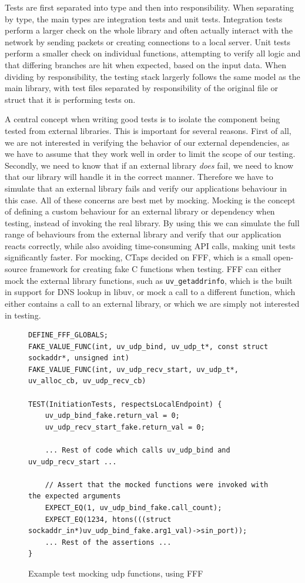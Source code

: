 Tests are first separated into type and then into responsibility. When separating
by type, the main types are integration tests and unit tests. Integration tests perform a larger check on the
whole library and often actually interact with the network by sending packets or creating
connections to a local server. 
Unit tests perform a smaller check on individual functions, attempting to verify
all logic and that differing branches are hit when expected, based on the input data.
When dividing by responsibility, the testing stack largerly follows the same model
as the main library, with test files separated by responsibility of the original
file or struct that it is performing tests on.

A central concept when writing good tests is to isolate the component being tested from
external libraries. This is important for several reasons. First of all, we are not interested
in verifying the behavior of our external dependencies, as we have to assume that they
work well in order to limit the scope of our testing. Secondly, we need to know that if
an external library \textit{does} fail, we need to know that our library will handle it
in the correct manner. Therefore we have to simulate that an external library fails and
verify our applications behaviour in this case. All of these concerns are best met by
mocking. Mocking is the concept of defining a custom behaviour for an external library
or dependency when testing, instead of invoking the real library. By using this we can
simulate the full range of behaviours from the external library and verify that our application
reacts correctly, while also avoiding time-consuming API calls, making unit tests
significantly faster. For mocking, CTaps decided on FFF, which is a small open-source
framework for creating fake C functions when testing. \cite{longFakeFunctionFramework2025}
FFF can either mock the external library functions, such as \texttt{uv\_getaddrinfo},
which is the built in support for DNS lookup in libuv, or mock a call to a different
function, which either contains a call to an external library, or which we are simply
not interested in testing.

\begin{figure}
\begin{verbatim}
DEFINE_FFF_GLOBALS;
FAKE_VALUE_FUNC(int, uv_udp_bind, uv_udp_t*, const struct sockaddr*, unsigned int)
FAKE_VALUE_FUNC(int, uv_udp_recv_start, uv_udp_t*, uv_alloc_cb, uv_udp_recv_cb)

TEST(InitiationTests, respectsLocalEndpoint) {
    uv_udp_bind_fake.return_val = 0;
    uv_udp_recv_start_fake.return_val = 0;
    
    ... Rest of code which calls uv_udp_bind and uv_udp_recv_start ...
    
    // Assert that the mocked functions were invoked with the expected arguments    
    EXPECT_EQ(1, uv_udp_bind_fake.call_count);
    EXPECT_EQ(1234, htons(((struct sockaddr_in*)uv_udp_bind_fake.arg1_val)->sin_port));
    ... Rest of the assertions ...
}

\end{verbatim}
\caption{Example test mocking udp functions, using FFF}
\end{figure}


